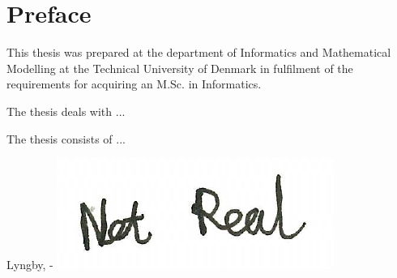 \chapter{Preface}

This thesis was prepared at the department of Informatics and Mathematical Modelling at the Technical University of Denmark in fulfilment of the
requirements for acquiring an M.Sc. in Informatics. 

The thesis deals with ... 

The thesis consists of ...
\vspace{20mm}
\begin{center}
	\hspace{20mm} Lyngby, \thesishandin-\thesisyear 
	\vspace{5mm}
	\newline
	\includegraphics[scale=0.5]{figures/SignatureDummy}
\end{center}
\begin{flushright}
	\thesisauthor
\end{flushright}
